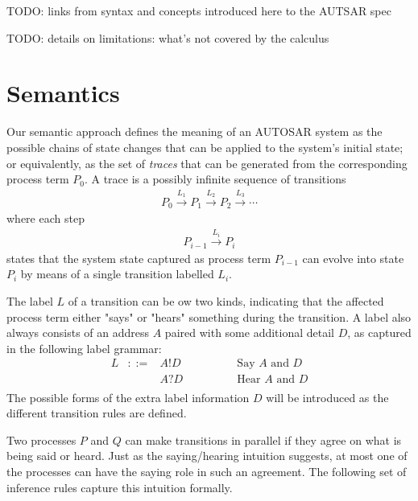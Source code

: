 \documentclass[twocolumn]{article}
\newcommand{\red} [1]{\xrightarrow{#1}}
\begin{document}
TODO: links from syntax and concepts introduced here to the AUTSAR spec

TODO: details on limitations: what's not covered by the calculus

\section{Semantics}
\label{sec:Sem}

Our semantic approach defines the meaning of an AUTOSAR system as the possible chains of state changes that can be applied to the system's initial state; or equivalently, as the set of \emph{traces} that can be generated from the corresponding process term $P_0$. A trace is a possibly infinite sequence of transitions
\[
\begin{array}{c}
	P_0 \red{L_1} P_1 \red{L_2} P_2 \red{L_3} \cdots
\end{array}
\]
where each step
\[
\begin{array}{c}
	P_{i-1} \red{L_i} P_i
\end{array}
\]
states that the system state captured as process term $P_{i-1}$ can evolve into state $P_i$ by means of a single transition labelled $L_i$.


The label $L$ of a transition can be ow two kinds, indicating that the affected process term either "says" or "hears" something during the transition. A label also always consists of an address $A$ paired with some additional detail $D$, as captured in the following label grammar:
\[
\begin{array}{rcll}
	L	& ::=		& A!D		& \hspace{4em}\text{Say $A$ and $D$} \\
		&		& A?D		& \hspace{4em}\text{Hear $A$ and $D$} \\
\end{array}
\]
The possible forms of the extra label information $D$ will be introduced as the different transition rules are defined.

Two processes $P$ and $Q$ can make transitions in parallel if they agree on what is being said or heard. Just as the saying/hearing intuition suggests, at most one of the processes can have the saying role in such an agreement. The following set of inference rules capture this intuition formally.
\end{document}
